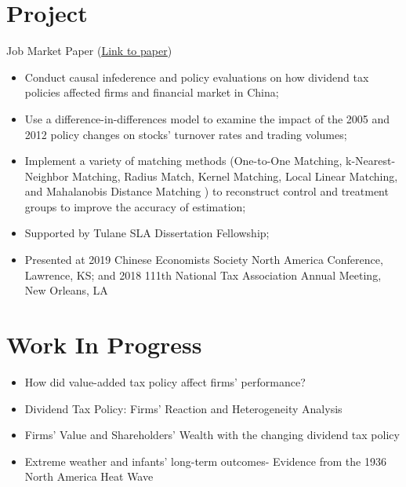 \documentclass{resume}
\begin{document}
\section{Project}
Job Market Paper (\href{https://liberalarts.tulane.edu/sites/liberalarts.tulane.edu/files/sites/default/files/Xie%20JMP_0.pdf}{\uline{Link to paper}})
\begin{itemize}
  \item Conduct causal infederence and policy evaluations on how dividend tax policies affected firms and financial market in China;
  \item Use a difference-in-differences model to examine the impact of the 2005 and 2012 policy changes on stocks’ turnover rates and trading volumes;
  \item Implement a variety of matching methods (One-to-One Matching, k-Nearest- Neighbor Matching, Radius Match, Kernel Matching, Local Linear Matching, and Mahalanobis Distance Matching ) to reconstruct control and treatment groups to improve the accuracy of estimation;
  \item Supported by Tulane SLA Dissertation Fellowship;
  \item Presented at 2019 Chinese Economists Society North America Conference, Lawrence, KS; and 2018 111th National Tax Association Annual Meeting, New Orleans, LA
\end{itemize}

\section{Work In Progress}
\begin{itemize}[parsep=0.25ex]
  \item How did value-added tax policy affect firms' performance?
  \item Dividend Tax Policy: Firms' Reaction and Heterogeneity Analysis
  \item Firms' Value and Shareholders' Wealth with the changing dividend tax policy
  \item Extreme weather and infants' long-term outcomes- Evidence from the 1936 North America Heat Wave 
\end{itemize}
\end{document}
